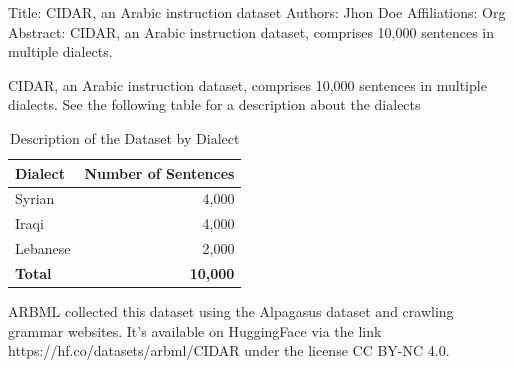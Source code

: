 Title: CIDAR, an Arabic instruction dataset
Authors: Jhon Doe
Affiliations: Org
Abstract: CIDAR, an Arabic instruction dataset, comprises 10,000 sentences in multiple dialects.

CIDAR, an Arabic instruction dataset, comprises 10,000 sentences in multiple dialects. See the following table for 
a description about the dialects
\begin{table}[ht]
    \centering
    \begin{tabular}{lr}
    \toprule
    \textbf{Dialect}   & \textbf{Number of Sentences} \\
    \midrule
    Syrian     & 4,000  \\
    Iraqi      & 4,000  \\
    Lebanese   & 2,000  \\
    \midrule
    \textbf{Total} & \textbf{10,000} \\
    \bottomrule
    \end{tabular}
    \caption{Description of the Dataset by Dialect}
    \label{tab:dataset_description}
    \end{table}

ARBML collected this dataset using the Alpagasus dataset and crawling grammar websites. 
It’s available on HuggingFace via the link https://hf.co/datasets/arbml/CIDAR under the license CC BY-NC 4.0.